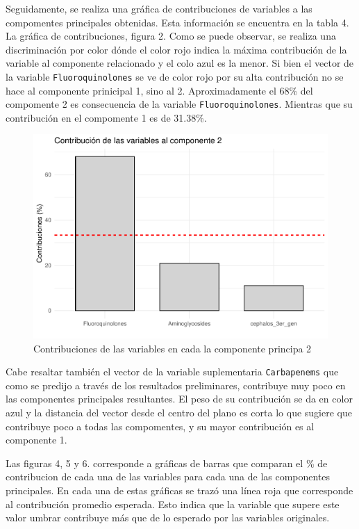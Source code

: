 \documentclass[
]{article}
\begin{document}
Seguidamente, se realiza una gráfica de contribuciones de variables a
las compomentes principales obtenidas. Esta información se encuentra en
la tabla 4. La gráfica de contribuciones, figura 2. Como se puede
observar, se realiza una discriminación por color dónde el color rojo
indica la máxima contribución de la variable al componente relacionado y
el colo azul es la menor. Si bien el vector de la variable
\texttt{Fluoroquinolones} se ve de color rojo por su alta contribución
no se hace al componente prinicipal 1, sino al 2. Aproximadamente el
68\% del compomente 2 es consecuencia de la variable
\texttt{Fluoroquinolones}. Mientras que su contribución en el compomente
1 es de 31.38\%.

\begin{figure}
\centering
\includegraphics{2_actividad_PCA_files/figure-latex/GRÁFICA contribución 2-1.pdf}
\caption{Contribuciones de las variables en cada la componente principa
2}
\end{figure}

Cabe resaltar también el vector de la variable suplementaria
\texttt{Carbapenems} que como se predijo a través de los resultados
preliminares, contribuye muy poco en las componentes principales
resultantes. El peso de su contribución se da en color azul y la
distancia del vector desde el centro del plano es corta lo que sugiere
que contribuye poco a todas las compomentes, y su mayor contribución es
al componente 1.

Las figuras 4, 5 y 6. corresponde a gráficas de barras que comparan el
\% de contribucion de cada una de las variables para cada una de las
componentes principales. En cada una de estas gráficas se trazó una
línea roja que corresponde al contribución promedio esperada. Esto
indica que la variable que supere este valor umbrar contribuye más que
de lo esperado por las variables originales.
\end{document}
